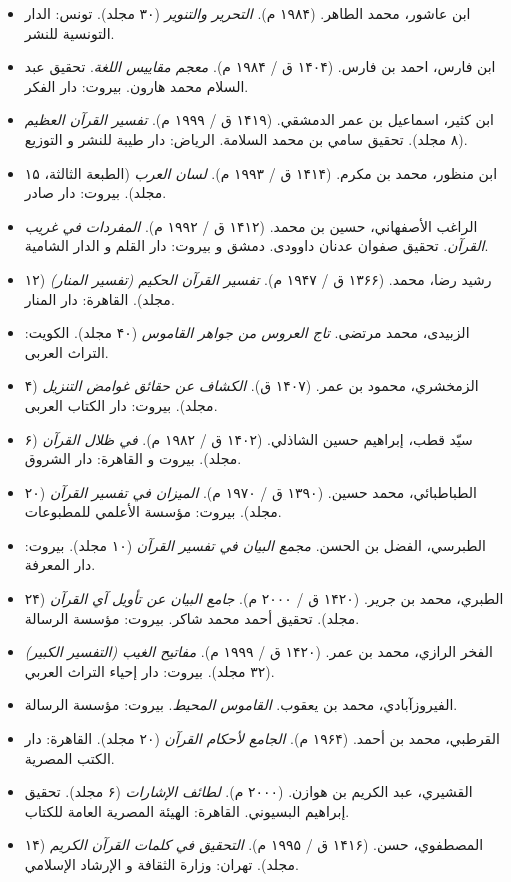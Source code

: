 \begin{RTL}
\begin{otherlanguage}{persian}
\begin{itemize}
\tightlist
\item
  ابن عاشور، محمد الطاهر. (۱۹۸۴ م). \emph{التحرير والتنوير} (۳۰ مجلد).
  تونس: الدار التونسية للنشر.
\item
  ابن فارس، احمد بن فارس. (۱۴۰۴ ق / ۱۹۸۴ م). \emph{معجم مقاييس اللغة}.
  تحقیق عبد السلام محمد هارون. بیروت: دار الفکر.
\item
  ابن کثیر، اسماعیل بن عمر الدمشقي. (۱۴۱۹ ق / ۱۹۹۹ م). \emph{تفسير
  القرآن العظيم} (۸ مجلد). تحقیق سامي بن محمد السلامة. الریاض: دار طیبة
  للنشر و التوزیع.
\item
  ابن منظور، محمد بن مکرم. (۱۴۱۴ ق / ۱۹۹۳ م). \emph{لسان العرب} (الطبعة
  الثالثة، ۱۵ مجلد). بیروت: دار صادر.
\item
  الراغب الأصفهاني، حسین بن محمد. (۱۴۱۲ ق / ۱۹۹۲ م). \emph{المفردات في
  غريب القرآن}. تحقیق صفوان عدنان داوودی. دمشق و بیروت: دار القلم و
  الدار الشامية.
\item
  رشید رضا، محمد. (۱۳۶۶ ق / ۱۹۴۷ م). \emph{تفسير القرآن الحكيم (تفسير
  المنار)} (۱۲ مجلد). القاهرة: دار المنار.
\item
  الزبیدی، محمد مرتضی. \emph{تاج العروس من جواهر القاموس} (۴۰ مجلد).
  الکویت: التراث العربی.
\item
  الزمخشري، محمود بن عمر. (۱۴۰۷ ق). \emph{الكشاف عن حقائق غوامض التنزيل}
  (۴ مجلد). بیروت: دار الکتاب العربی.
\item
  سیّد قطب، إبراهیم حسین الشاذلي. (۱۴۰۲ ق / ۱۹۸۲ م). \emph{في ظلال
  القرآن} (۶ مجلد). بیروت و القاهرة: دار الشروق.
\item
  الطباطبائي، محمد حسین. (۱۳۹۰ ق / ۱۹۷۰ م). \emph{الميزان في تفسير
  القرآن} (۲۰ مجلد). بیروت: مؤسسة الأعلمي للمطبوعات.
\item
  الطبرسي، الفضل بن الحسن. \emph{مجمع البيان في تفسير القرآن} (۱۰ مجلد).
  بیروت: دار المعرفة.
\item
  الطبري، محمد بن جریر. (۱۴۲۰ ق / ۲۰۰۰ م). \emph{جامع البيان عن تأويل آي
  القرآن} (۲۴ مجلد). تحقیق أحمد محمد شاکر. بیروت: مؤسسة الرسالة.
\item
  الفخر الرازي، محمد بن عمر. (۱۴۲۰ ق / ۱۹۹۹ م). \emph{مفاتيح الغيب
  (التفسير الكبير)} (۳۲ مجلد). بیروت: دار إحياء التراث العربي.
\item
  الفیروزآبادي، محمد بن یعقوب. \emph{القاموس المحيط}. بیروت: مؤسسة
  الرسالة.
\item
  القرطبي، محمد بن أحمد. (۱۹۶۴ م). \emph{الجامع لأحكام القرآن} (۲۰
  مجلد). القاهرة: دار الکتب المصرية.
\item
  القشیري، عبد الکریم بن هوازن. (۲۰۰۰ م). \emph{لطائف الإشارات} (۶
  مجلد). تحقیق إبراهیم البسيوني. القاهرة: الهيئة المصرية العامة للکتاب.
\item
  المصطفوي، حسن. (۱۴۱۶ ق / ۱۹۹۵ م). \emph{التحقيق في كلمات القرآن
  الكريم} (۱۴ مجلد). تهران: وزارة الثقافة و الإرشاد الإسلامي.
\end{itemize}


\end{otherlanguage}
\end{RTL}
